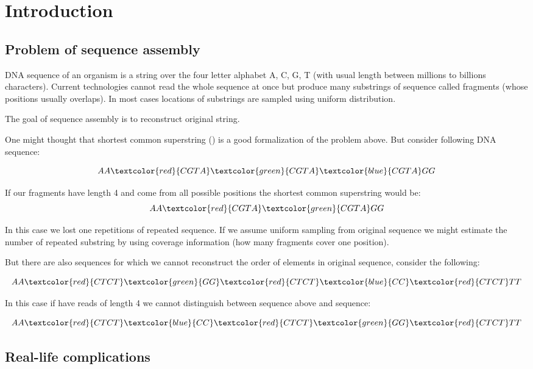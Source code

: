 \chapter{Introduction}

\section{Problem of sequence assembly}

DNA sequence of an organism is a string over the four letter alphabet A, C, G, T
(with usual length between millions to billions characters).
Current technologies cannot read the whole sequence at once but produce many
substrings of sequence called fragments (whose positions usually overlaps).
In most cases locations of substrings are sampled using uniform distribution.

The goal of sequence assembly is to reconstruct original string.

One might thought that shortest common superstring (\cite{maier1977note}) 
is a good formalization of the problem above. But consider following DNA sequence:

$$AA\textcolor{red}{CGTA}\textcolor{green}{CGTA}\textcolor{blue}{CGTA}GG$$

If our fragments have length 4 and come from all possible positions the shortest
common superstring would be:
$$AA\textcolor{red}{CGTA}\textcolor{green}{CGTA}GG$$

In this case we lost one repetitions of repeated sequence. If we assume uniform
sampling from original sequence we might estimate the number of repeated substring
by using coverage information (how many fragments cover one position).

But there are also sequences for which we cannot reconstruct the order of elements in
original sequence, consider the following:

$$AA\textcolor{red}{CTCT}\textcolor{green}{GG}\textcolor{red}{CTCT}\textcolor{blue}{CC}\textcolor{red}{CTCT}TT$$

In this case if have reads of length 4 we cannot distinguish between sequence above and
sequence:

$$AA\textcolor{red}{CTCT}\textcolor{blue}{CC}\textcolor{red}{CTCT}\textcolor{green}{GG}\textcolor{red}{CTCT}TT$$


\section{Real-life complications}

